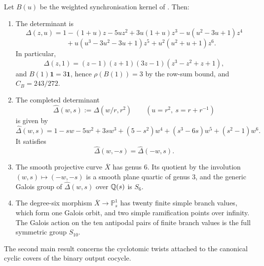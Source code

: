 \begin{theorem}
\label{thm:intro-kernel-geometry}
Let \(B(u)\) be the weighted synchronisation kernel of
. Then:
\begin{enumerate}[label=\textup{(\roman*)}]
  \item The determinant is
  \[
    \Delta(z,u)
    =1-(1+u)z-5uz^2+3u(1+u)z^3-u(u^2-3u+1)z^4
  \]
  \[
    \qquad
    +u(u^3-3u^2-3u+1)z^5+u^2(u^2+u+1)z^6.
  \]
  In particular,
  \[
    \Delta(z,1)=(z-1)(z+1)(3z-1)(z^3-z^2+z+1),
  \]
  and \(B(1)\mathbf1=3\mathbf1\), hence
  \(\rho(B(1))=3\) by the row-sum bound, and
  \(C_B=243/272\).

  \item The completed determinant
  \[
    \widehat\Delta(w,s):=\Delta(w/r,r^2)
    \qquad (u=r^2,\ s=r+r^{-1})
  \]
  is given by
  \[
    \widehat\Delta(w,s)
    =1-sw-5w^2+3sw^3+(5-s^2)w^4+(s^3-6s)w^5+(s^2-1)w^6.
  \]
  It satisfies
  \[
    \widehat\Delta(w,-s)=\widehat\Delta(-w,s).
  \]

  \item The smooth projective curve \(\overline{X}\) has genus \(6\).
  Its quotient by the involution \((w,s)\mapsto(-w,-s)\) is a smooth
  plane quartic of genus \(3\), and the generic Galois group of
  \(\widehat\Delta(w,s)\) over \(\mathbb{Q}(s)\) is \(S_6\).

  \item The degree-six morphism
  \(\overline X\to\mathbb P^1_s\) has twenty finite simple branch
  values, which form one Galois orbit, and two simple ramification
  points over infinity. The Galois action on the ten antipodal pairs of
  finite branch values is the full symmetric group \(S_{10}\).
\end{enumerate}
\end{theorem}

The second main result concerns the cyclotomic twists attached to the
canonical cyclic covers of the binary output cocycle.

